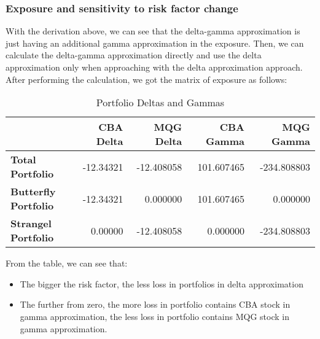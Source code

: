 \subsubsection{Exposure and sensitivity to risk factor change}
With the derivation above, we can see that the delta-gamma approximation is just having an additional gamma approximation in the exposure. Then, we can calculate the delta-gamma approximation directly and use the delta approximation only when approaching with the delta approximation approach. After performing the calculation, we got the matrix of exposure as follows:
\begin{table}[H]
\centering
\begin{tabular}{|l|r|r|r|r|}
\hline
 & \textbf{CBA Delta} & \textbf{MQG Delta} & \textbf{CBA Gamma} & \textbf{MQG Gamma} \\ \hline
\textbf{Total Portfolio} & -12.34321 & -12.408058 & 101.607465 & -234.808803 \\
\textbf{Butterfly Portfolio} & -12.34321 & 0.000000 & 101.607465 & 0.000000 \\
\textbf{Strangel Portfolio} & 0.00000 & -12.408058 & 0.000000 & -234.808803 \\
\hline
\end{tabular}
\caption{Portfolio Deltas and Gammas}
\label{table:portfolio_deltas_gammas}
\end{table}
From the table, we can see that:
\begin{itemize}
    \item The bigger the risk factor, the less loss in portfolios in delta approximation
    \item The further from zero, the more loss in portfolio contains CBA stock in gamma approximation, the less loss in portfolio contains MQG stock in gamma approximation.
\end{itemize}
